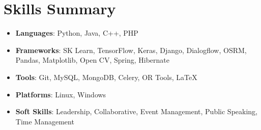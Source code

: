 \documentclass[a4paper,20pt]{article}
\newcommand{\resumeItem}[2]{
	\item\small{
		\textbf{#1}{: #2 \vspace{-2pt}}
	}
}
\newcommand{\resumeSubItem}[2]{\resumeItem{#1}{#2}\vspace{-3pt}}
\newcommand{\resumeSubHeadingListStart}{\begin{itemize}[leftmargin=*]}
\newcommand{\resumeSubHeadingListEnd}{\end{itemize}}
\begin{document}
	\section{Skills Summary}
	\resumeSubHeadingListStart
	\resumeSubItem{Languages}{\hspace{0.5cm}Python, Java, C++, PHP}
	\resumeSubItem{Frameworks}{\hspace{0.2cm}SK Learn, TensorFlow, Keras, Django, Dialogflow, OSRM, Pandas, Matplotlib, Open CV, Spring, Hibernate}
	\resumeSubItem{Tools}{\hspace{1.3cm}Git, MySQL, MongoDB, Celery, OR Tools, \LaTeX}
	\resumeSubItem{Platforms}{\hspace{0.6cm}Linux, Windows}
	\resumeSubItem{Soft Skills}{\hspace{0.56cm}Leadership, Collaborative, Event Management, Public Speaking, Time Management}
	
	\resumeSubHeadingListEnd
	\vspace{7pt}
	
	
	
		
\end{document}
